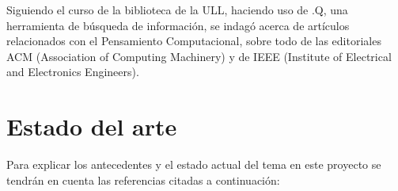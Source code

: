 
Siguiendo el curso de la biblioteca de la ULL, haciendo uso de .Q\cite{PuntoQ}, una herramienta de búsqueda de información, se indagó acerca de artículos relacionados con el Pensamiento Computacional, sobre todo de las editoriales ACM\cite{ACM} (Association of Computing Machinery) y 
de IEEE\cite{IEEE} (Institute of Electrical and Electronics Engineers).


\section{Estado del arte}
\label{2:sec:1}

Para explicar los antecedentes y el estado actual del tema en este proyecto se tendrán en cuenta las referencias citadas a continuación:

